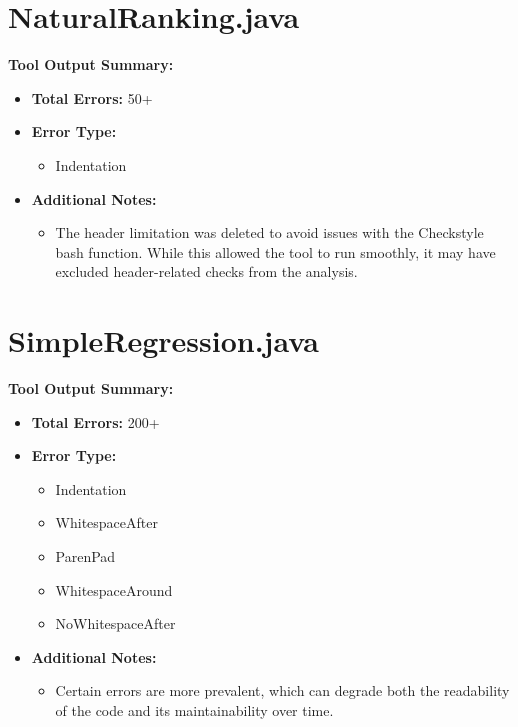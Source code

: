 \documentclass[twocolumn,10pt]{article}
\begin{document}
\begin{appendix}
\section{NaturalRanking.java}
\textbf{Tool Output Summary:}
\begin{itemize}[itemsep=0pt, topsep=0pt, parsep=0pt, partopsep=0pt]
    \item \textbf{Total Errors:} 50+
    \item \textbf{Error Type:} 
    \begin{itemize}
        \item Indentation
    \end{itemize}
    \item \textbf{Additional Notes:}
    \begin{itemize}[itemsep=0pt, topsep=0pt, parsep=0pt, partopsep=0pt]
        \item The header limitation was deleted to avoid issues with the Checkstyle bash function. While this allowed the tool to run smoothly, it may have excluded header-related checks from the analysis.
    \end{itemize}
\end{itemize}

\section{SimpleRegression.java}
\textbf{Tool Output Summary:}
\begin{itemize}[itemsep=0pt, topsep=0pt, parsep=0pt, partopsep=0pt]
    \item \textbf{Total Errors:} 200+
    \item \textbf{Error Type:} 
    \begin{itemize}[itemsep=0pt, topsep=0pt, parsep=0pt, partopsep=0pt]
        \item Indentation
        \item WhitespaceAfter
        \item ParenPad
        \item WhitespaceAround
        \item NoWhitespaceAfter
    \end{itemize}
    \item \textbf{Additional Notes:}
    \begin{itemize}[itemsep=0pt, topsep=0pt, parsep=0pt, partopsep=0pt]
        \item Certain errors are more prevalent, which can degrade both the readability of the code and its maintainability over time.
    \end{itemize}
\end{itemize}


\end{appendix}
\end{document}
